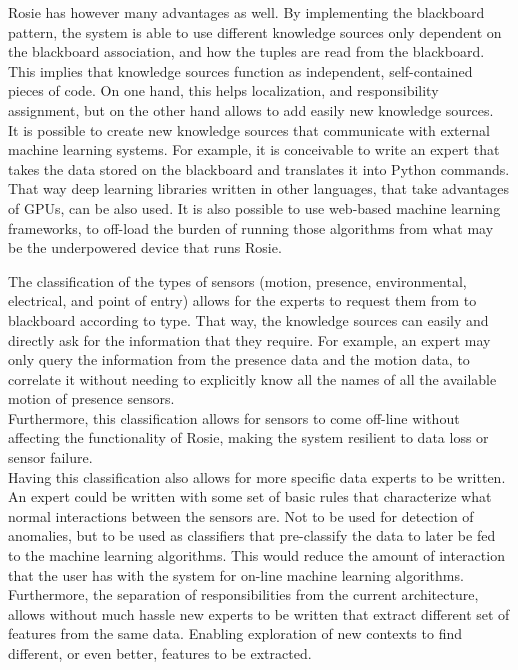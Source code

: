 Rosie has however many advantages as well. By implementing the blackboard pattern, the system is able to use different knowledge sources only dependent on the blackboard association, and how the tuples are read from the blackboard. This implies that knowledge sources function as independent, self-contained pieces of code. On one hand, this helps localization, and responsibility assignment, but on the other hand allows to add easily new knowledge sources. \\
It is possible to create new knowledge sources that communicate with external machine learning systems. For example, it is conceivable to write an expert that takes the data stored on the blackboard and translates it into Python commands. That way deep learning libraries written in other languages, that take advantages of GPUs, can be also used. It is also possible to use web-based machine learning frameworks, to off-load the burden of running those algorithms from what may be the underpowered device that runs Rosie.

The classification of the types of sensors (motion, presence, environmental, electrical, and point of entry) allows for the experts to request them from to blackboard according to type. That way, the knowledge sources can easily and directly ask for the information that they require. For example, an expert may only query the information from the presence data and the motion data, to correlate it without needing to explicitly know all the names of all the available motion of presence sensors.\\
Furthermore, this classification allows for sensors to come off-line without affecting the functionality of Rosie, making the system resilient to data loss or sensor failure.\\
Having this classification also allows for more specific data experts to be written. An expert could be written with some set of basic rules that characterize what normal interactions between the sensors are. Not to be used for detection of anomalies, but to be used as classifiers that pre-classify the data to later be fed to the machine learning algorithms. This would reduce the amount of interaction that the user has with the system for on-line machine learning algorithms.\\
Furthermore, the separation of responsibilities from the current architecture, allows without much hassle new experts to be written that extract different set of features from the same data. Enabling exploration of new contexts to find different, or even better, features to be extracted. \\

